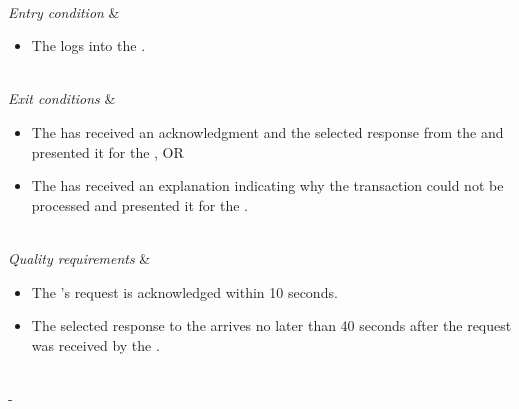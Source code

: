 \begin{table}[h!]
\begin{tabu}
\begin{enumerate}[leftmargin=*,topsep=0pt,itemsep=-1ex]
{		}
			\newline
	\end{enumerate} \\
	\hline
	\textit{Entry condition} &
	\vspace{-3mm}
	\begin{itemize}[leftmargin=*,topsep=0pt,itemsep=-1ex]
		\item The \researcher logs into the \client.
	\end{itemize} \\
	\hline
	\textit{Exit conditions} &
	\vspace{-3mm}
	\begin{itemize}[leftmargin=*,topsep=0pt,itemsep=-1ex]
		\item The \client has received an acknowledgment and the selected response from the \server and presented it for the \researcher, OR
		\item The \client has received an explanation indicating why the transaction could not be processed and presented it for the \researcher.
	\end{itemize} \\
	\hline
	\textit{Quality \newline requirements} &
	\vspace{-3mm}
	\begin{itemize}[leftmargin=*,topsep=0pt,itemsep=-1ex]
		\item The \researcher's request is acknowledged within 10 seconds.
		\item The selected response to the \client arrives no later than 40 seconds after the request was received by the \server.
	\end{itemize} \\
	\tabucline[1.5pt]-
\end{tabu}
\caption{Use case: ExportProtocol}
\label{uc:ExportProtocol}
\end{table}